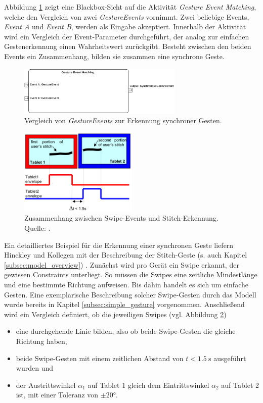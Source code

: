 Abbildung \ref{fig:gesture_event_matching} zeigt eine Blackbox-Sicht auf die Aktivität \textit{Gesture Event Matching}, welche den Vergleich von zwei \textit{GestureEvents} vornimmt. Zwei beliebige Events, \textit{Event A} und \textit{Event B}, werden als Eingabe akzeptiert. Innerhalb der Aktivität wird ein Vergleich der Event-Parameter durchgeführt, der analog zur einfachen Gestenerkennung einen Wahrheitswert zurückgibt. Besteht zwischen den beiden Events ein Zusammenhang, bilden sie zusammen eine synchrone Geste.
\begin{figure}[h]
\centering
\includegraphics[width=0.7\textwidth]{bilder/gesture_event_matching.pdf}
\caption{Vergleich von \textit{GestureEvents} zur Erkennung synchroner Gesten.}
\label{fig:gesture_event_matching}
\end{figure}

\begin{figure}[h]
\centering
\includegraphics[width=0.5\textwidth]{bilder/stitch_details.png}
\caption{Zusammenhang zwischen Swipe-Events und Stitch-Erkennung. Quelle: \citep{Hinckley2004}.}
\label{fig:stitch_details}
\end{figure}

Ein detailliertes Beispiel für die Erkennung einer synchronen Geste liefern Hinckley und Kollegen mit der Beschreibung der Stitch-Geste (s. auch Kapitel \ref{subsec:model_overview}) \citep{Hinckley2004}. Zunächst wird pro Gerät ein Swipe erkannt, der gewissen Constraints unterliegt. So müssen die Swipes eine zeitliche Mindestlänge und eine bestimmte Richtung aufweisen. Bis dahin handelt es sich um einfache Gesten. Eine exemplarische Beschreibung solcher Swipe-Gesten durch das Modell wurde bereits in Kapitel \ref{subsec:simple_gesture} vorgenommen. Anschließend wird ein Vergleich definiert, ob die jeweiligen Swipes (vgl. Abbildung \ref{fig:stitch_details})
\begin{itemize}
\item eine durchgehende Linie bilden, also ob beide Swipe-Gesten die gleiche Richtung haben,
\item beide Swipe-Gesten mit einem zeitlichen Abstand von \(t<\SI{1.5}{\second}\) ausgeführt wurden und
\item der Austrittswinkel \(\alpha_1\) auf Tablet 1 gleich dem Eintrittswinkel \(\alpha_2\) auf Tablet 2 ist, mit einer Toleranz von \(\pm \ang{20}\).
\end{itemize}

